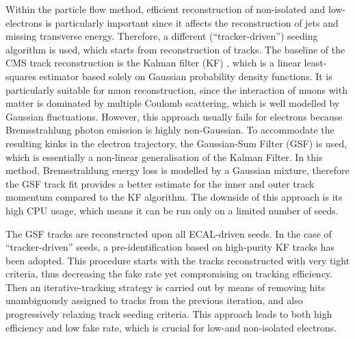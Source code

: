 
Within the particle flow method, efficient reconstruction of non-isolated and low-\pt electrons is particularly
important since it affects the reconstruction of jets and missing transverse energy. Therefore, a different
(``tracker-driven'') seeding algorithm is used, which starts from reconstruction of tracks. The baseline of the CMS
track reconstruction is the Kalman filter (KF) \autocite{KF}, which is a linear least-squares estimator based solely on
Gaussian probability density functions. It is particularly suitable for muon reconstruction, since the interaction of
muons with matter is dominated by multiple Coulomb scattering, which is well modelled by Gaussian fluctuations. However,
this approach usually fails for electrons because Bremsstrahlung photon emission is highly non-Gaussian. To accommodate
the resulting kinks in the electron trajectory, the Gaussian-Sum Filter (GSF) \autocite{GSF} is used, which is
essentially a non-linear generalisation of the Kalman Filter. In this method, Bremsstrahlung energy loss is modelled by
a Gaussian mixture, therefore the GSF track fit provides a better estimate for the inner and outer track momentum
compared to the KF algorithm. The downside of this approach is its high CPU usage, which means it can be run only on a
limited number of seeds.

The GSF tracks are reconstructed upon all ECAL-driven seeds. In the case of ``tracker-driven'' seeds, a
pre-identification based on high-purity KF tracks has been adopted. This procedure starts with the tracks reconstructed
with very tight criteria, thus decreasing the fake rate yet compromising on tracking efficiency. Then an
iterative-tracking strategy is carried out by means of removing hits unambiguously assigned to tracks from the previous
iteration, and also progressively relaxing track seeding criteria. This approach leads to both high efficiency and low
fake rate, which is crucial for low-\pt and non-isolated electrons.

